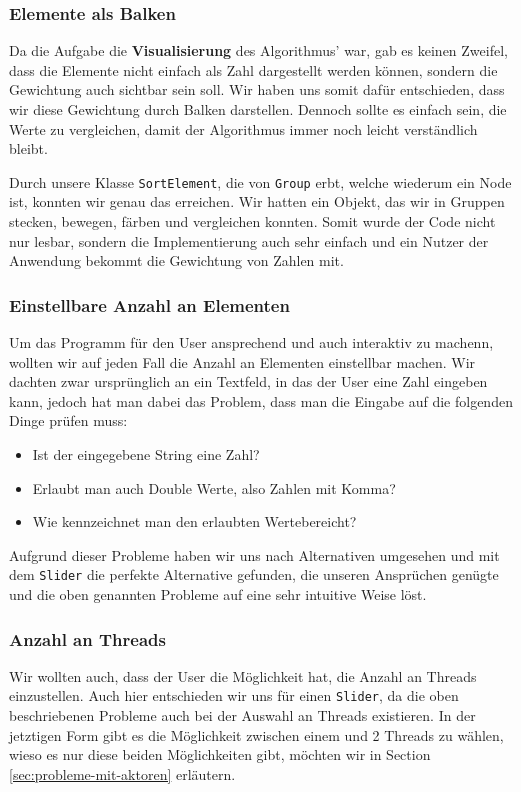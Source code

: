 \subsubsection{Elemente als Balken}
Da die Aufgabe die \textbf{Visualisierung} des Algorithmus' war, gab es keinen Zweifel, dass die Elemente nicht einfach als Zahl dargestellt werden können, sondern die Gewichtung auch sichtbar sein soll. Wir haben uns somit dafür entschieden, dass wir diese Gewichtung durch Balken darstellen. Dennoch sollte es einfach sein, die Werte zu vergleichen, damit der Algorithmus immer noch leicht verständlich bleibt.

Durch unsere Klasse \texttt{SortElement}, die von \texttt{Group} erbt, welche wiederum ein Node ist, konnten wir genau das erreichen. Wir hatten ein Objekt, das wir in Gruppen stecken, bewegen, färben und vergleichen konnten. Somit wurde der Code nicht nur lesbar, sondern die Implementierung auch sehr einfach und ein Nutzer der Anwendung bekommt die Gewichtung von Zahlen mit.

\subsubsection{Einstellbare Anzahl an Elementen}
Um das Programm für den User ansprechend und auch interaktiv zu machenn, wollten wir auf jeden Fall die Anzahl an Elementen einstellbar machen. Wir dachten zwar ursprünglich an ein Textfeld, in das der User eine Zahl eingeben kann, jedoch hat man dabei das Problem, dass man die Eingabe auf die folgenden Dinge prüfen muss:

\begin{itemize}
\item Ist der eingegebene String eine Zahl?
\item Erlaubt man auch Double Werte, also Zahlen mit Komma?
\item Wie kennzeichnet man den erlaubten Wertebereicht?
\end{itemize}

Aufgrund dieser Probleme haben wir uns nach Alternativen umgesehen und mit dem \texttt{Slider} die perfekte Alternative gefunden, die unseren Ansprüchen genügte und die oben genannten Probleme auf eine sehr intuitive Weise löst.

\subsubsection{Anzahl an Threads}
Wir wollten auch, dass der User die Möglichkeit hat, die Anzahl an Threads einzustellen. Auch hier entschieden wir uns für einen \texttt{Slider}, da die oben beschriebenen Probleme auch bei der Auswahl an Threads existieren. In der jetztigen Form gibt es die Möglichkeit zwischen einem und 2 Threads zu wählen, wieso es nur diese beiden Möglichkeiten gibt, möchten wir in Section \ref{sec:probleme-mit-aktoren} erläutern.

